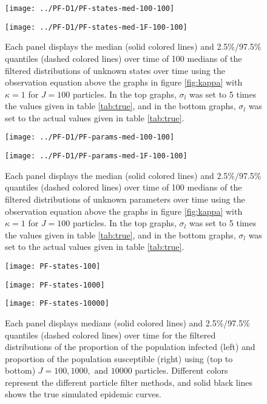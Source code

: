 \documentclass{article}
\begin{document}
\begin{figure}[ht]
\begin{minipage}{1.0\linewidth}
\texttt{[image: ../PF-D1/PF-states-med-100-100]}
\end{minipage}
\begin{minipage}{1.0\linewidth}
\texttt{[image: ../PF-D1/PF-states-med-1F-100-100]}
\end{minipage}
\caption{Each panel displays the median (solid colored lines) and 2.5\%/97.5\% quantiles (dashed colored lines) over time of 100 medians of the filtered distributions of unknown states over time using the observation equation above the graphs in figure \ref{fig:kappa} with $\kappa = 1$ for $J = 100$ particles. In the top graphs, $\sigma_l$ was set to 5 times the values given in table \ref{tab:true}, and in the bottom graphs, $\sigma_l$ was set to the actual values given in table \ref{tab:true}.}
\end{figure}

\begin{figure}[ht]
\begin{minipage}{1.0\linewidth}
\texttt{[image: ../PF-D1/PF-params-med-100-100]}
\end{minipage}
\begin{minipage}{1.0\linewidth}
\texttt{[image: ../PF-D1/PF-params-med-1F-100-100]}
\end{minipage}
\caption{Each panel displays the median (solid colored lines) and 2.5\%/97.5\% quantiles (dashed colored lines) over time of 100 medians of the filtered distributions of unknown parameters over time using the observation equation above the graphs in figure \ref{fig:kappa} with $\kappa = 1$ for $J = 100$ particles. In the top graphs, $\sigma_l$ was set to 5 times the values given in table \ref{tab:true}, and in the bottom graphs, $\sigma_l$ was set to the actual values given in table \ref{tab:true}.}
\end{figure}

\begin{figure}[ht]
\centering
\begin{minipage}{1.0\linewidth}
\texttt{[image: PF-states-100]}
\end{minipage}
\begin{minipage}{1.0\linewidth}
\texttt{[image: PF-states-1000]}
\end{minipage}
\begin{minipage}{1.0\linewidth}
\texttt{[image: PF-states-10000]}
\end{minipage}
\caption{Each panel displays medians (solid colored lines) and 2.5\%/97.5\% quantiles (dashed colored lines) over time for the filtered distributions of the proportion of the population infected (left) and proportion of the population susceptible (right) using (top to bottom) $J = 100, 1000, \mbox{ and } 10000$ particles.  Different colors represent the different particle filter methods, and solid black lines shows the true simulated epidemic curves.} \label{fig:states}
\end{figure}
\end{document}
